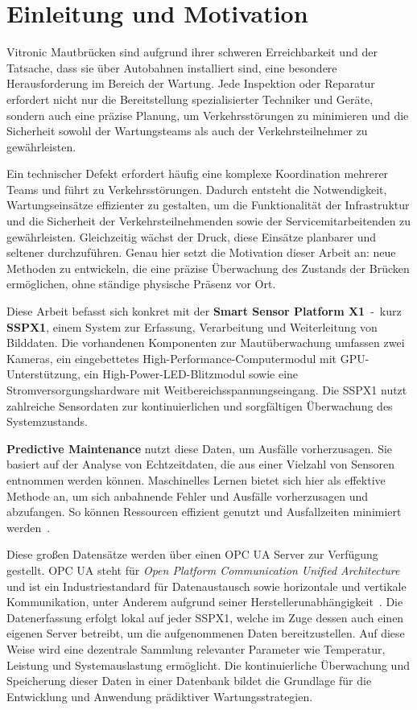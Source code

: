 \chapter{Einleitung und Motivation}
Vitronic Mautbrücken sind aufgrund ihrer schweren Erreichbarkeit und der Tatsache, dass sie über Autobahnen installiert
sind, eine besondere Herausforderung im Bereich der Wartung. Jede Inspektion oder Reparatur erfordert nicht nur die
Bereitstellung spezialisierter Techniker und Geräte, sondern auch eine präzise Planung, um Verkehrsstörungen zu
minimieren und die Sicherheit sowohl der Wartungsteams als auch der Verkehrsteilnehmer zu gewährleisten.

Ein technischer Defekt erfordert häufig eine komplexe Koordination mehrerer Teams und führt zu Verkehrsstörungen. Dadurch
entsteht die Notwendigkeit, Wartungseinsätze effizienter zu gestalten, um die Funktionalität der Infrastruktur und die
Sicherheit der Verkehrsteilnehmenden sowie der Servicemitarbeitenden zu gewährleisten. Gleichzeitig wächst der Druck, diese
Einsätze planbarer und seltener durchzuführen. Genau hier setzt die Motivation dieser Arbeit an: neue Methoden zu entwickeln, die
eine präzise Überwachung des Zustands der Brücken ermöglichen, ohne ständige physische Präsenz vor Ort.

Diese Arbeit befasst sich konkret mit der \textbf{Smart Sensor Platform X1}~-~kurz \textbf{SSPX1}, einem System zur
Erfassung, Verarbeitung und Weiterleitung von Bilddaten. Die vorhandenen Komponenten zur Mautüberwachung umfassen zwei Kameras,
ein eingebettetes High-Performance-Computermodul mit GPU-Unterstützung, ein High-Power-LED-Blitzmodul sowie
eine Stromversorgungshardware mit Weitbereichsspannungseingang. Die SSPX1 nutzt zahlreiche Sensordaten zur
kontinuierlichen und sorgfältigen Überwachung des Systemzustands.

\textbf{Predictive Maintenance} nutzt diese Daten, um Ausfälle vorherzusagen. Sie basiert auf der Analyse
von Echtzeitdaten, die aus einer Vielzahl von Sensoren entnommen werden können. Maschinelles Lernen bietet sich hier als effektive
Methode an, um sich anbahnende Fehler und Ausfälle vorherzusagen und abzufangen. So können Ressourcen effizient
genutzt und Ausfallzeiten minimiert werden~\cite{TobonMejia2012}.

Diese großen Datensätze werden über einen OPC UA Server zur Verfügung gestellt. OPC UA steht für \textit{Open Platform Communication
Unified Architecture} und ist ein Industriestandard für Datenaustausch sowie horizontale und vertikale Kommunikation, unter Anderem
aufgrund seiner Herstellerunabhängigkeit~\cite{Babel2024}.
Die Datenerfassung erfolgt lokal auf jeder SSPX1, welche im Zuge dessen auch einen eigenen Server betreibt, um die aufgenommenen
Daten bereitzustellen. Auf diese Weise wird eine dezentrale Sammlung relevanter Parameter wie Temperatur,
Leistung und Systemauslastung ermöglicht. Die kontinuierliche Überwachung und Speicherung dieser Daten in einer Datenbank
bildet die Grundlage für die Entwicklung und Anwendung prädiktiver Wartungsstrategien.

